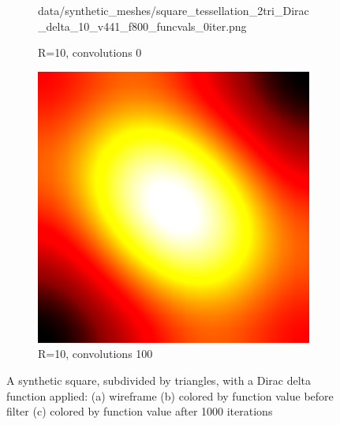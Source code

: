 \begin{figure}[ht]
\begin{subfigure}[b]{0.32\linewidth}
		{data/synthetic_meshes/square_tessellation_2tri_Dirac_delta_10_v441_f800_funcvals_0iter.png}
		\caption{R=10, convolutions 0}\label{fig:sq2.e}
	\end{subfigure}
	\begin{subfigure}[b]{0.32\linewidth}
		\includegraphics[width=\linewidth]
		{data/synthetic_meshes/square_tessellation_2tri_Dirac_delta_10_v441_f800_funcvals_100iter.png}
		\caption{R=10, convolutions 100}\label{fig:sq2.f}
	\end{subfigure}
	{\caption[Synthetic Square, 2 triangles, Dirac delta function]{A synthetic square, subdivided by triangles, with a Dirac delta function applied: (a) wireframe (b) colored by function value before filter (c) colored by function value after 1000 iterations
	}\label{fig:sq2}}
\end{figure}
